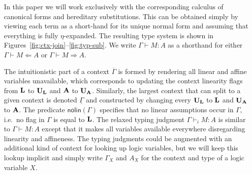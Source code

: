 \documentclass{eptcs}
\newcommand\fA{\textup{$\mathbf{A}$}}
\newcommand\fL{\textup{$\mathbf{L}$}}
\newcommand\fUA{{\textup{\textbf{U}}_\textup{\textbf{A}}}}
\newcommand\fUL{{\textup{\textbf{U}}_\textup{\textbf{L}}}}
\theoremstyle{definition}
\begin{document}
In this paper we will work exclusively with the corresponding calculus of canonical
forms and hereditary substitutions.  This can be obtained simply by
viewing each term as a short-hand for its unique normal form and
assuming that everything is fully $\eta$-expanded.  The resulting type
system is shown in Figures~\ref{fig:ctx-join}--\ref{fig:typ-sub}.
We write $\Gamma\vdash M:A$ as a shorthand for either $\Gamma\vdash M\Leftarrow A$
or $\Gamma\vdash M\Rightarrow A$.

The intuitionistic part of a context $\overline{\Gamma}$ is formed by
rendering all linear and affine variables unavailable, which corresponds to updating
the context linearity flags from
$\fL$ to $\fUL$ and $\fA$ to $\fUA$.
Similarly, the largest context that can split to a given context is
denoted $\underline{\Gamma}$ and constructed by changing every
$\fUL$ to $\fL$ and $\fUA$ to $\fA$.
The predicate $\textsf{nolin}(\Gamma)$ specifies that no linear
assumptions occur in $\Gamma$, i.e.\ no flag in $\Gamma$ is equal to
$\fL$.  The relaxed typing judgment $\Gamma\vdash_i M:A$ is
similar to $\Gamma\vdash M:A$ except that it makes all variables
available everywhere disregarding linearity and affineness.
The typing judgments could be augmented with an additional kind of
context for looking up logic variables, but we will keep this lookup
implicit and simply write $\Gamma_X$ and $A_X$ for the context and type
of a logic variable $X$.
\end{document}
